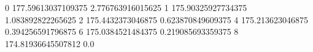 0 177.59613037109375 2.776763916015625
1 175.90325927734375 1.083892822265625
2 175.4432373046875 0.623870849609375
4 175.213623046875 0.394256591796875
6 175.0384521484375 0.219085693359375
8 174.81936645507812 0.0
